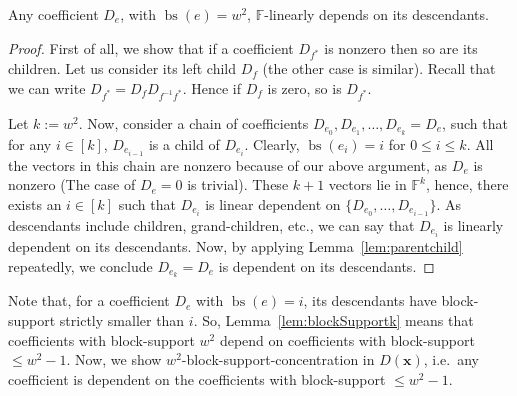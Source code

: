 \documentclass[final,oneeqnum, onethmnum, onefignum]{siamltex1213}
\newcommand{\F}{\mathbb F}
\newcommand{\Dx}{D(\mathbf{x})}
\DeclareMathOperator{\bs}{bs}
\begin{document}
\begin{lemma}
Any coefficient $D_e$, with $\bs(e) = w^2$, $\F$-linearly depends on
its descendants. 
\label{lem:blockSupportk}
\end{lemma}
\begin{proof}
First of all, we show that if a 
coefficient $D_{f^*}$ is nonzero then so are
its children. 
Let us consider its left child $D_f$ (the other case is similar).
Recall that we can write $D_{f^*} = D_f D_{f^{-1}f^*}$.
Hence if $D_f$ is zero, so is $D_{f^*}$. 

Let $k:= w^2$.
Now, consider a chain of coefficients
$D_{e_0}, D_{e_1}, \dots, D_{e_k}=D_e$,
such that for any $i \in [k]$, 
$D_{e_{i-1}}$ is a child of $D_{e_{i}}$. 
Clearly, $\bs(e_i) = i$ for $0 \leq i \leq k$. 
All the vectors in this chain are nonzero
because of our above argument, as $D_e$ is nonzero
(The case of $D_e = 0$ is trivial).
These $k+1$ vectors lie in $\F^{k}$, 
hence, there exists an $i \in [k]$
such that $D_{e_{i}}$ is linear dependent on 
$\{ D_{e_0}, \dots, D_{e_{i-1}}\}$. 
As descendants include children, grand-children, etc.,
we can say that $D_{e_i}$ is linearly dependent on
its descendants. 
Now, by applying Lemma~\ref{lem:parentchild}
repeatedly, we conclude $D_{e_{k}} = D_e$ 
is dependent on its descendants. 
\end{proof}

Note that, for a coefficient $D_e$ with $\bs(e) = i$,
its descendants have block-support strictly smaller than
$i$.
So, Lemma~\ref{lem:blockSupportk} means that coefficients
with block-support $w^2$ depend on coefficients with block-support
$\leq w^2-1$.
Now, we show $w^2$-block-support-concentration in $\Dx$,
i.e.\ any coefficient is   
dependent on the coefficients with block-support $\leq w^2-1$.
\end{document}
